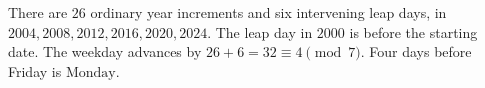 There are $26$ ordinary year increments and six intervening leap days, in $2004,2008,2012,2016,2020,2024$. The leap day in $2000$ is before the starting date. The weekday advances by $26+6=32\equiv4\pmod7$. Four days before Friday is $\boxed{\text{Monday}}$.
